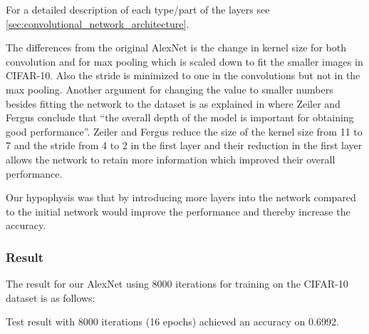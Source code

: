 For a detailed description of each type/part of the layers see
\autoref{sec:convolutional_network_architecture}. 


The differences from the original AlexNet is the change in kernel size for both
convolution and for max pooling which is scaled down to fit the smaller
images in CIFAR-10. Also the stride is minimized to one in the convolutions but
not in the max pooling. Another argument for changing the value to smaller
numbers besides fitting the network to the dataset is as explained in
\cite{ZeilerFergus} where Zeiler and Fergus conclude that ``the overall depth of
the model is important for obtaining good performance''. Zeiler and
Fergus\cite{ZeilerFergus} reduce the size of the kernel size from 11 to 7 and
the stride from 4 to 2 in the first layer and their reduction in the first layer
allows the network to retain more information which improved their overall
performance. 


Our hypophysis was that by introducing more layers into the network compared to
the initial network would improve the performance and thereby increase the
accuracy.


\subsubsection{Result}

The result for our AlexNet using 8000 iterations for training on the CIFAR-10
dataset is as follows: 

Test result with 8000 iterations (16 epochs) achieved an accuracy on 0.6992. 


